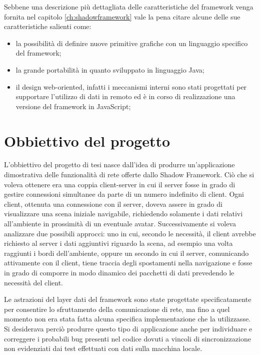 Sebbene una descrizione pi\`u dettagliata delle caratteristiche del framework venga fornita nel capitolo \ref{ch:shadowframework} vale la pena citare alcune delle sue caratteristiche salienti come: 
\begin{itemize}
	\item  la possibilit\`a di definire nuove primitive grafiche con un linguaggio specifico del framework;
	\item  la grande portabilit\`a in quanto sviluppato in linguaggio Java;
	\item  il design web-oriented, infatti i meccanismi interni sono stati progettati per supportare l'utilizzo di dati in remoto ed \`e in corso di realizzazione una versione del framework in JavaScript;
\end{itemize}
%
%
\section{Obbiettivo del progetto}
\label{sec:obbiettivo}
L'obbiettivo del progetto di tesi nasce dall'idea di produrre un'applicazione dimostrativa delle funzionalit\`a di rete offerte dallo Shadow Framework.
Ci\`o che si voleva ottenere era una coppia client-server in cui il server fosse in grado di gestire connessioni simultanee da parte di un numero indefinito di client. 
Ogni client, ottenuta una connessione con il server, doveva assere in grado di visualizzare una scena iniziale navigabile, richiedendo solamente i dati relativi all'ambiente in prossimit\`a di un eventuale avatar.
Successivamente si voleva analizzare due possibili approcci: uno in cui, secondo le necessit\`a, il client avrebbe richiesto al server i dati aggiuntivi riguardo la scena, ad esempio una volta raggiunti i bordi dell'ambiente, oppure un secondo in cui il server, comunicando attivamente con il client, tiene traccia degli spostamenti nella navigazione e fosse in grado di comporre in modo dinamico dei pacchetti di dati prevedendo le necessit\`a del client.

Le astrazioni del layer dati del framework sono state progettate specificatamente per consentire lo sfruttamento della comunicazione di rete, ma fino a quel momento non era stata fatta alcuna specifica implementazione che la utilizzasse. Si desiderava perci\`o produrre questo tipo di applicazione anche per individuare e correggere i probabili bug presenti nel codice dovuti a vincoli di sincronizzazione non evidenziati dai test effettuati con dati sulla macchina locale.

